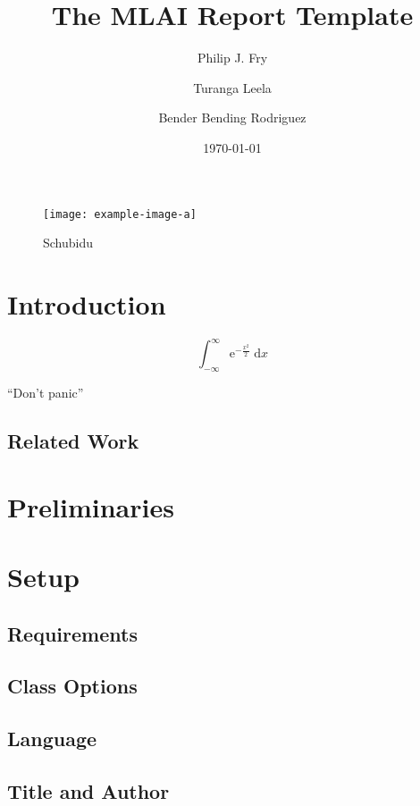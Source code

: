 \documentclass[logo]{mlai-report}
\title{The MLAI Report Template}
\author{Philip J. Fry \and Turanga Leela \and Bender Bending Rodriguez}
\date{\today}
\begin{document}
	\maketitle
	
	\begin{abstract}
		\blindtext 
	\end{abstract}
	
	\begin{figure}[tp] 
		\centering
		\texttt{[image: example-image-a]} 
		\caption{Schubidu} 
		\label{fig:example-image} 
	\end{figure}

	\section{Introduction}
	
	\begin{equation}
	\int_{-\infty}^\infty \mathrm{e}^{-\frac{x^2}{2}} \; \mathrm{d}x 
	\end{equation}
	
	\enquote{Don't panic} \parencite{adams1979} \blindtext
	
	\subsection{Related Work} 
	
	\section{Preliminaries} 

	\section{Setup} 
	
	\subsection{Requirements} 
	
	\subsection{Class Options} 
	
	\subsection{Language} 
	
	\subsection{Title and Author}
	
\end{document}

